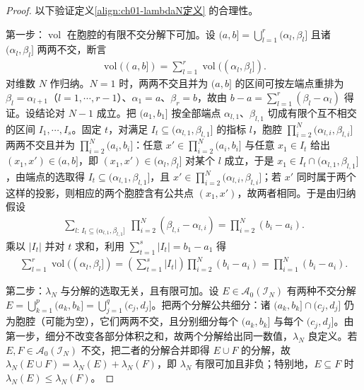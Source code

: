 \documentclass[../../main.tex]{subfiles}%
\begin{document}
\begin{proof}
以下验证定义\eqref{align:ch01-lambdaN定义} 的合理性。

第一步：$\operatorname{vol}$ 在胞腔的有限不交分解下可加。设 $(a,b]=\bigcup_{l=1}^r(\alpha_l,\beta_l]$ 且诸 $(\alpha_l,\beta_l]$ 两两不交，断言
\begin{align*}
\operatorname{vol}((a,b])=\sum_{l=1}^r\operatorname{vol}((\alpha_l,\beta_l]).
\end{align*}
对维数 $N$ 作归纳。$N=1$ 时，两两不交且并为 $(a,b]$ 的区间可按左端点重排为 $\beta_l=\alpha_{l+1}$（$l=1,\cdots ,r-1$）、$\alpha_1=a$、$\beta_r=b$，故由 $b-a=\sum_{l=1}^r(\beta_l-\alpha_l)$ 得证。设结论对 $N-1$ 成立。把 $(a_1,b_1]$ 按全部端点 $\alpha_{l,1}$、$\beta_{l,1}$ 切成有限个互不相交的区间 $I_1,\cdots ,I_s$。固定 $t$，对满足 $I_t\subseteq(\alpha_{l,1},\beta_{l,1}]$ 的指标 $l$，胞腔 $\prod_{i=2}^N(\alpha_{l,i},\beta_{l,i}]$ 两两不交且并为 $\prod_{i=2}^N(a_i,b_i]$：任意 $x'\in\prod_{i=2}^N(a_i,b_i]$ 与任意 $x_1\in I_t$ 给出 $(x_1,x')\in(a,b]$，即 $(x_1,x')\in(\alpha_l,\beta_l]$ 对某个 $l$ 成立，于是 $x_1\in I_t\cap(\alpha_{l,1},\beta_{l,1}]$，由端点的选取得 $I_t\subseteq(\alpha_{l,1},\beta_{l,1}]$，且 $x'\in\prod_{i=2}^N(\alpha_{l,i},\beta_{l,i}]$；若 $x'$ 同时属于两个这样的投影，则相应的两个胞腔含有公共点 $(x_1,x')$，故两者相同。于是由归纳假设
\begin{align*}
\sum_{l:\,I_t\subseteq(\alpha_{l,1},\beta_{l,1}]}\ \prod_{i=2}^N(\beta_{l,i}-\alpha_{l,i})=\prod_{i=2}^N(b_i-a_i).
\end{align*}
乘以 $|I_t|$ 并对 $t$ 求和，利用 $\sum_{t=1}^s|I_t|=b_1-a_1$ 得
\begin{align*}
\sum_{l=1}^r\operatorname{vol}((\alpha_l,\beta_l])=\left(\sum_{t=1}^s|I_t|\right)\prod_{i=2}^N(b_i-a_i)=\prod_{i=1}^N(b_i-a_i).
\end{align*}

第二步：$\lambda_N$ 与分解的选取无关，且有限可加。设 $E\in\mathcal{A}_0(\mathcal{I}_N)$ 有两种不交分解 $E=\bigcup_{k=1}^p(a_k,b_k]=\bigcup_{j=1}^q(c_j,d_j]$。把两个分解公共细分：诸 $(a_k,b_k]\cap(c_j,d_j]$ 仍为胞腔（可能为空），它们两两不交，且分别细分每个 $(a_k,b_k]$ 与每个 $(c_j,d_j]$。由第一步，细分不改变各部分体积之和，故两个分解给出同一数值，$\lambda_N$ 良定义。若 $E,F\in\mathcal{A}_0(\mathcal{I}_N)$ 不交，把二者的分解合并即得 $E\cup F$ 的分解，故 $\lambda_N(E\cup F)=\lambda_N(E)+\lambda_N(F)$，即 $\lambda_N$ 有限可加且非负；特别地，$E\subseteq F$ 时 $\lambda_N(E)\leqslant\lambda_N(F)$。


\end{proof}
\end{document}
